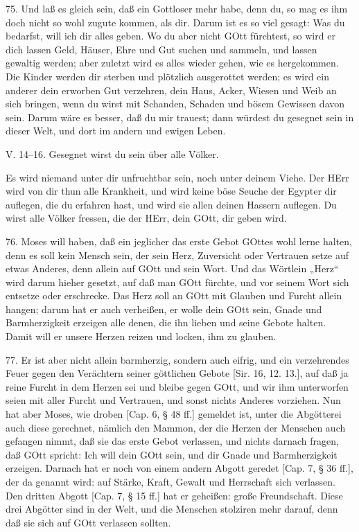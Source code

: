 75. Und laß es gleich sein, daß ein Gottloser mehr habe, denn du, so mag es ihm doch nicht so wohl zugute kommen, als dir. Darum ist es so viel gesagt: Was du bedarfst, will ich dir alles geben. Wo du aber nicht GOtt fürchtest, so wird er dich lassen Geld, Häuser, Ehre und Gut suchen und sammeln, und lassen gewaltig werden; aber zuletzt wird es alles wieder gehen, wie es hergekommen. Die Kinder werden dir sterben und plötzlich ausgerottet werden; es wird ein anderer dein erworben Gut verzehren, dein Haus, Acker, Wiesen und Weib an sich bringen, wenn du wirst mit Schanden, Schaden und bösem Gewissen davon sein. Darum wäre es besser, daß du mir trauest; dann würdest du gesegnet sein in dieser Welt, und dort im andern und ewigen Leben.

\begin{schriftzitat}
V. 14–16. Gesegnet wirst du sein über alle Völker.
\end{schriftzitat}

Es wird niemand unter dir unfruchtbar sein, noch unter deinem Viehe. Der HErr wird von dir thun alle Krankheit, und wird keine böse Seuche der Egypter dir auflegen, die du erfahren hast, und wird sie allen deinen Hassern auflegen. Du wirst alle Völker fressen, die der HErr, dein GOtt, dir geben wird.

76. Moses will haben, daß ein jeglicher das erste Gebot GOttes wohl lerne halten, denn es soll kein Mensch sein, der sein Herz, Zuversicht oder Vertrauen setze auf etwas Anderes, denn allein auf GOtt und sein Wort. Und das Wörtlein „Herz“ wird darum hieher gesetzt, auf daß man GOtt fürchte, und vor seinem Wort sich entsetze oder erschrecke. Das Herz soll an GOtt mit Glauben und Furcht allein hangen; darum hat er auch verheißen, er wolle dein GOtt sein, Gnade und Barmherzigkeit erzeigen alle denen, die ihn lieben und seine Gebote halten. Damit will er unsere Herzen reizen und locken, ihm zu glauben.

77. Er ist aber nicht allein barmherzig, sondern auch eifrig, und ein verzehrendes Feuer gegen den Verächtern seiner göttlichen Gebote [Sir. 16, 12. 13.], auf daß ja reine Furcht in dem Herzen sei und bleibe gegen GOtt, und wir ihm unterworfen seien mit aller Furcht und Vertrauen, und sonst nichts Anderes vorziehen. Nun hat aber Moses, wie droben [Cap. 6, § 48 ff.] gemeldet ist, unter die Abgötterei auch diese gerechnet, nämlich den Mammon, der die Herzen der Menschen auch gefangen nimmt, daß sie das erste Gebot verlassen, und nichts darnach fragen, daß GOtt spricht: Ich will dein GOtt
sein, und dir Gnade und Barmherzigkeit erzeigen. Darnach hat er noch von einem andern Abgott geredet [Cap. 7, § 36 ff.], der da genannt wird: auf Stärke, Kraft, Gewalt und Herrschaft sich verlassen. Den dritten Abgott [Cap. 7, § 15 ff.] hat er geheißen: große Freundschaft. Diese drei Abgötter sind in der Welt, und die Menschen stolziren mehr darauf, denn daß sie sich auf GOtt verlassen sollten.

